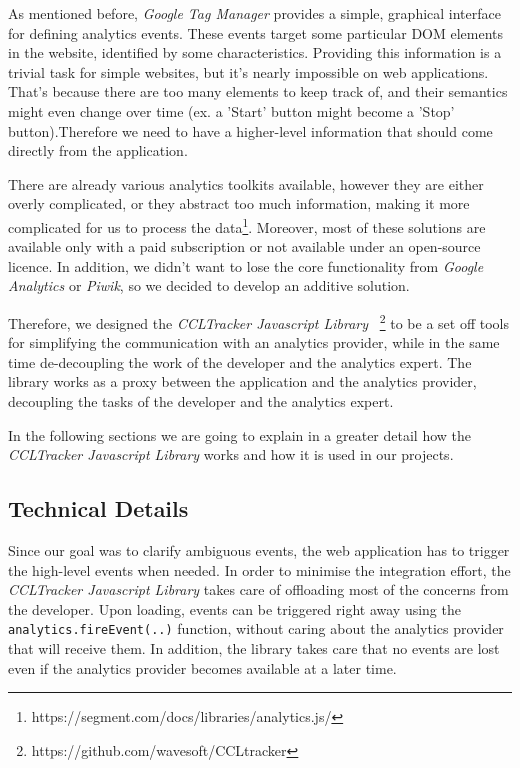 
\newcommand{\CCLTrackerJS}{ \emph{CCLTracker Javascript Library} }

As mentioned before, \emph{Google Tag Manager} provides a simple, graphical interface for defining analytics events. These events target some particular DOM elements in the website, identified by some characteristics. Providing this information is a trivial task for simple websites, but it's nearly impossible on web applications. That's because there are too many elements to keep track of, and their semantics might even change over time (ex. a 'Start' button might become a 'Stop' button).Therefore we need to have a higher-level information that should come directly from the application. 

There are already various analytics toolkits available, however they are either overly complicated, or they abstract too much information, making it more complicated for us to process the data\footnote{https://segment.com/docs/libraries/analytics.js/}. Moreover, most of these solutions are available only with a paid subscription or not available under an open-source licence. In addition, we didn't want to lose the core functionality from \emph{Google Analytics} or \emph{Piwik}, so we decided to develop an additive solution.

Therefore, we designed the \CCLTrackerJS~\footnote{https://github.com/wavesoft/CCLtracker} to be a set off tools for simplifying the communication with an analytics provider, while in the same time de-decoupling the work of the developer and the analytics expert. The library works as a proxy between the application and the analytics provider, decoupling the tasks of the developer and the analytics expert.

In the following sections we are going to explain in a greater detail how the \CCLTrackerJS works and how it is used in our projects.

\subsection{Technical Details}

Since our goal was to clarify ambiguous events, the web application has to trigger the high-level events when needed. In order to minimise the integration effort, the \CCLTrackerJS takes care of offloading most of the concerns from the developer. Upon loading, events can be triggered right away using the \texttt{analytics.fireEvent(..)} function, without caring about the analytics provider that will receive them. In addition, the library takes care that no events are lost even if the analytics provider becomes available at a later time.

